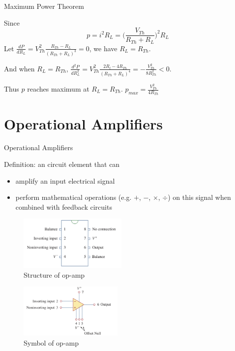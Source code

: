 \documentclass{beamer}
\begin{document}

\begin{frame}{Maximum Power Theorem}

Since
$$
    p=i^2R_{L}=\Big(\frac{V_{Th}}{R_{Th}+R_L}\Big)^2 R_{L} 
$$
Let $\frac{dP}{dR_L}=V_{Th}^2\frac{R_{Th}-R_L}{(R_{Th}+R_L)^3}=0$, we have $R_L=R_{Th}$.

And when $R_{L}=R_{Th}$, $\frac{d^2P}{dR_L^2}=V_{Th}^2\frac{2R_l-4R_{Th}}{(R_{Th}+R_L)^4}=-\frac{V_{Th}^2}{8R_{Th}^2}<0$.

Thus $p$ reaches maximum at $R_L=R_{Th}$. \textcolor{}{$p_{max}=\frac{V_{Th}^2}{4R_{Th}}$}

\end{frame}


\section{Operational Amplifiers}

\begin{frame}{Operational Amplifiers}

Definition: an circuit element that can
\begin{itemize}
    \item amplify an input electrical signal
    \item perform mathematical operations (e.g. $+$, $-$, $\times$, $\div$) on this signal when combined with feedback circuits
\end{itemize}


\begin{multicols}{2}
    \sectiont{}
    \begin{figure}[H]
        \centering
        \includegraphics[width=0.47\textwidth]{img_opamp/1_opamp structure.png}
        \caption{Structure of op-amp}
    \end{figure}
    \sectiont{}
    \begin{figure}[H]
        \centering
        \includegraphics[width=0.45\textwidth]{img_opamp/2_opamp connection.png}
        \caption{Symbol of op-amp}
    \end{figure}
    
\end{multicols}


\end{frame}
\end{document}
